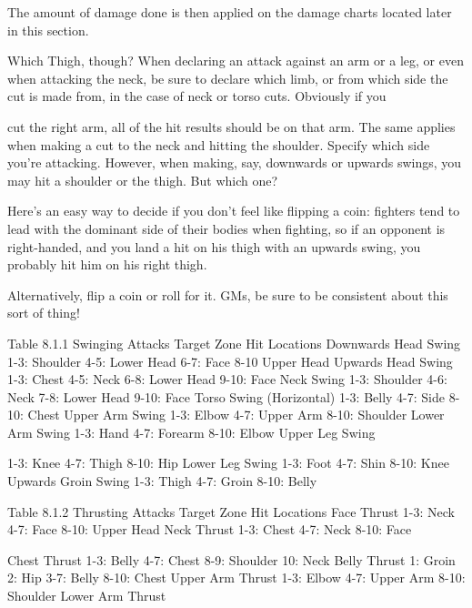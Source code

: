 \documentclass[oneside,11pt,english]{book}
\begin{document}
 

The amount of damage done is then applied on the damage charts located later in this section. 

 

Which Thigh, though? 
When declaring an attack against an arm or a leg, or even when attacking the neck, be sure to declare 
which limb, or from which side the cut is made from, in the case of neck or torso cuts. Obviously if you 


cut the right arm, all of the hit results should be on that arm. The same applies when making a cut to the 
neck and hitting the shoulder. Specify which side you’re attacking. 
However, when making, say, downwards or upwards swings, you may hit a shoulder or the thigh. But 
which one? 

 

Here’s an easy way to decide if you don’t feel like flipping a coin: fighters tend to lead with the dominant 
side of their bodies when fighting, so if an opponent is right-handed, and you land a hit on his thigh with 
an upwards swing, you probably hit him on his right thigh. 

 

Alternatively, flip a coin or roll for it. GMs, be sure to be consistent about this sort of thing! 

 

 


Table 8.1.1 Swinging Attacks 
Target Zone Hit Locations 
Downwards Head Swing 1-3: Shoulder 
4-5: Lower Head 
6-7: Face 
8-10 Upper Head 
Upwards Head Swing 1-3: Chest 
4-5: Neck 
6-8: Lower Head 
9-10: Face 
Neck Swing 1-3: Shoulder 
4-6: Neck 
7-8: Lower Head 
9-10: Face 
Torso Swing (Horizontal) 1-3: Belly 
4-7: Side 
8-10: Chest 
Upper Arm Swing 1-3: Elbow 
4-7: Upper Arm 
8-10: Shoulder 
Lower Arm Swing 1-3: Hand 
4-7: Forearm 
8-10: Elbow 
Upper Leg Swing 

 

1-3: Knee 
4-7: Thigh 
8-10: Hip 
Lower Leg Swing 1-3: Foot 
4-7: Shin 
8-10: Knee 
Upwards Groin Swing 1-3: Thigh 
4-7: Groin 
8-10: Belly 
 

 
Table 8.1.2 Thrusting Attacks 
Target Zone Hit Locations 
Face Thrust 1-3: Neck 
4-7: Face 
8-10: Upper Head 
Neck Thrust 1-3: Chest 
4-7: Neck 
8-10: Face 


Chest Thrust 1-3: Belly 
4-7: Chest 
8-9: Shoulder 
10: Neck 
Belly Thrust 1: Groin 
2: Hip 
3-7: Belly 
8-10: Chest 
Upper Arm Thrust 1-3: Elbow 
4-7: Upper Arm 
8-10: Shoulder 
Lower Arm Thrust 
\end{document}
